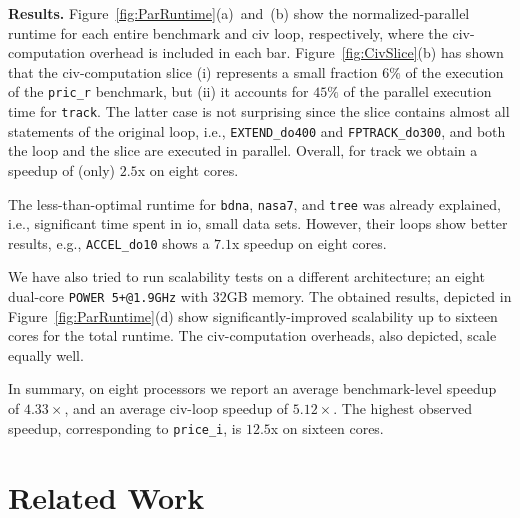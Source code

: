 \documentclass[10pt,nocopyrightspace]{sigplanconf}
\begin{document}
\vspace{1ex}

{\bf Results.} Figure~\ref{fig:ParRuntime}(a)~and~(b) show
the normalized-parallel runtime for each entire benchmark 
and {\sc civ} loop, respectively, where the {\sc civ}-computation
overhead is included in each bar.
%
Figure~\ref{fig:CivSlice}(b) has shown that the {\sc civ}-computation slice 
(i) represents a small fraction $6\%$ of the execution of the 
{\tt pric\_r} benchmark,
but (ii) it accounts for $45\%$ of the parallel execution time for {\tt track}.
The latter case is not surprising since the slice contains almost all statements 
of the original loop, i.e., {\tt EXTEND\_do400} and {\tt FPTRACK\_do300}, 
and both the loop and the slice are executed in parallel.    
Overall, for track we obtain a speedup of (only) $2.5$x on eight cores.


The less-than-optimal runtime for {\tt bdna}, {\tt nasa7}, and 
{\tt tree} was already explained, i.e., significant time spent in {\sc io},
small data sets. However, their loops show better results,
e.g., {\tt ACCEL\_do10} shows a  $7.1$x speedup on eight cores.

We have also tried to run scalability tests on a different 
architecture; an eight dual-core {\tt POWER 5+@1.9GHz} with 
$32$GB memory. The obtained results, depicted  in Figure~\ref{fig:ParRuntime}(d) show 
significantly-improved scalability up to sixteen cores for the 
total runtime. The {\sc civ}-computation overheads, also depicted, scale equally well.  

 
In summary, on eight processors we report an average benchmark-level
speedup of $4.33\times$, and an average {\sc civ}-loop speedup of $5.12\times$. 
The highest observed speedup, corresponding to {\tt price\_i}, is $12.5$x 
on sixteen cores.

 
\section{Related Work}  
\label{sec:RelWork}
\end{document}
